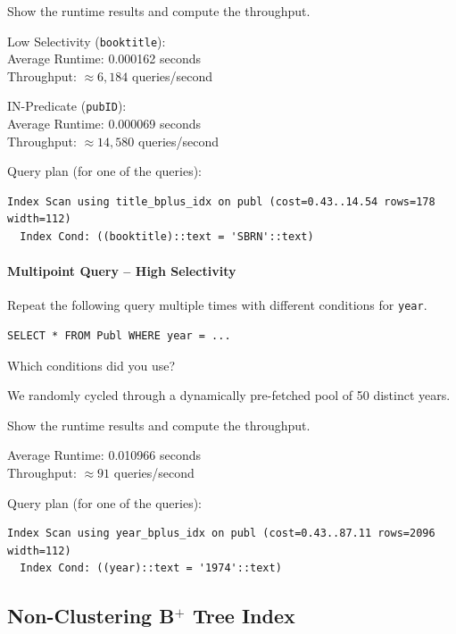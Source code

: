 \documentclass[11pt]{scrartcl}
\begin{document}
Show the runtime results and compute the throughput.

Low Selectivity (\texttt{booktitle}): \\
Average Runtime: 0.000162 seconds \\
Throughput: $\approx 6,184$ queries/second

\vspace{0.5em}
IN-Predicate (\texttt{pubID}): \\
Average Runtime: 0.000069 seconds \\
Throughput: $\approx 14,580$ queries/second

Query plan (for one of the queries):

{\small
\parskip0pt\begin{verbatim}
Index Scan using title_bplus_idx on publ (cost=0.43..14.54 rows=178 width=112)
  Index Cond: ((booktitle)::text = 'SBRN'::text)
\end{verbatim}}

\paragraph{Multipoint Query -- High Selectivity}

Repeat the following query multiple times with different conditions for \texttt{year}.

\begin{lstlisting}[style=dbtsql]
SELECT * FROM Publ WHERE year = ...
\end{lstlisting}

Which conditions did you use?

We randomly cycled through a dynamically pre-fetched pool of 50 distinct years.

Show the runtime results and compute the throughput.

Average Runtime: 0.010966 seconds \\
Throughput: $\approx 91$ queries/second

Query plan (for one of the queries):

{\small
\parskip0pt\begin{verbatim}
Index Scan using year_bplus_idx on publ (cost=0.43..87.11 rows=2096 width=112)
  Index Cond: ((year)::text = '1974'::text)
\end{verbatim}}

\subsection*{Non-Clustering B$^+$ Tree Index}
\end{document}
